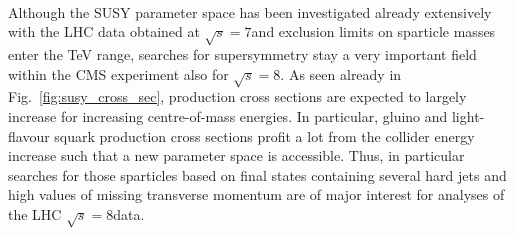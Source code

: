 \\
Although the SUSY parameter space has been investigated already extensively with the LHC data obtained at $\sqrt{s} = 7$\tev and exclusion limits on sparticle masses enter the TeV range, searches for supersymmetry stay a very important field within the CMS experiment also for $\sqrt{s} = 8$\tev. As seen already in Fig.~\ref{fig:susy_cross_sec}, production cross sections are expected to largely increase for increasing centre-of-mass energies. In particular, gluino and light-flavour squark production cross sections profit a lot from the collider energy increase such that a new parameter space is accessible. Thus, in particular searches for those sparticles based on final states containing several hard jets and high values of missing transverse momentum are of major interest for analyses of the LHC $\sqrt{s} = 8$\tev data.   






